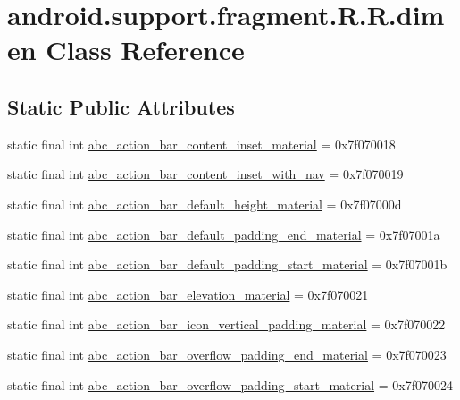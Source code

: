 \hypertarget{classandroid_1_1support_1_1fragment_1_1_r_1_1dimen}{
\section{android.support.fragment.R.R.dimen Class Reference}
\label{classandroid_1_1support_1_1fragment_1_1_r_1_1dimen}
}
\subsection*{Static Public Attributes}
\begin{CompactItemize}
\item 
static final int \hyperlink{classandroid_1_1support_1_1fragment_1_1_r_1_1dimen_c8468532644ff03e511a2d7306393c8c}{abc\_\-action\_\-bar\_\-content\_\-inset\_\-material} = 0x7f070018
\item 
static final int \hyperlink{classandroid_1_1support_1_1fragment_1_1_r_1_1dimen_20656b9647abe08933e6e7fc57f3ec0f}{abc\_\-action\_\-bar\_\-content\_\-inset\_\-with\_\-nav} = 0x7f070019
\item 
static final int \hyperlink{classandroid_1_1support_1_1fragment_1_1_r_1_1dimen_2bb50dee4a021ef4aa7a7d56e8f6215e}{abc\_\-action\_\-bar\_\-default\_\-height\_\-material} = 0x7f07000d
\item 
static final int \hyperlink{classandroid_1_1support_1_1fragment_1_1_r_1_1dimen_d3e99f4957886bab88a44dae244d5af7}{abc\_\-action\_\-bar\_\-default\_\-padding\_\-end\_\-material} = 0x7f07001a
\item 
static final int \hyperlink{classandroid_1_1support_1_1fragment_1_1_r_1_1dimen_350fb93adcb87659ff75646bec6e0138}{abc\_\-action\_\-bar\_\-default\_\-padding\_\-start\_\-material} = 0x7f07001b
\item 
static final int \hyperlink{classandroid_1_1support_1_1fragment_1_1_r_1_1dimen_2d855a52be51bcc919499d8e0f3bddae}{abc\_\-action\_\-bar\_\-elevation\_\-material} = 0x7f070021
\item 
static final int \hyperlink{classandroid_1_1support_1_1fragment_1_1_r_1_1dimen_ccc45f6894d329d0fbfa36fc72fbdf72}{abc\_\-action\_\-bar\_\-icon\_\-vertical\_\-padding\_\-material} = 0x7f070022
\item 
static final int \hyperlink{classandroid_1_1support_1_1fragment_1_1_r_1_1dimen_13e9310f30a69d8f2d79e39a34e39f61}{abc\_\-action\_\-bar\_\-overflow\_\-padding\_\-end\_\-material} = 0x7f070023
\item 
static final int \hyperlink{classandroid_1_1support_1_1fragment_1_1_r_1_1dimen_f0ea454a2e271954f645b4709ccb7c7e}{abc\_\-action\_\-bar\_\-overflow\_\-padding\_\-start\_\-material} = 0x7f070024

\end{CompactItemize}

